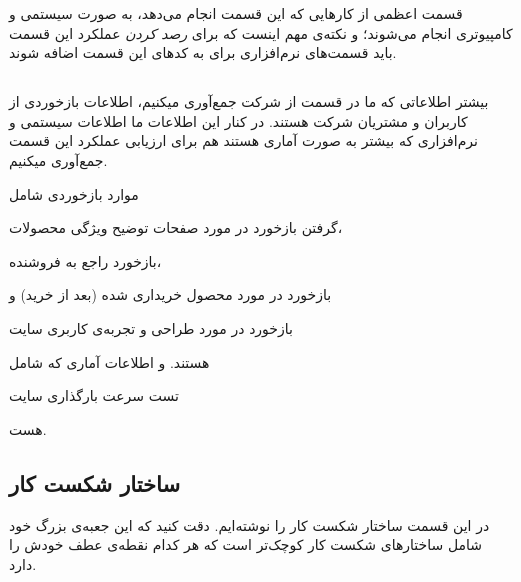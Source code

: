 قسمت اعظمی از کار‌هایی که این قسمت انجام می‌دهد، به صورت سیستمی و کامپیوتری انجام می‌شوند؛ و نکته‌ی مهم اینست که برای \textit{رصد کردن} عملکرد این قسمت باید قسمت‌های نرم‌افزاری برای  به کد‌های این قسمت اضافه شوند. 

\subsection{}\label{ssec:site}
بیشتر اطلاعاتی که ما در قسمت 
از شرکت جمع‌آوری میکنیم، اطلاعات بازخوردی از کاربران و مشتریان شرکت هستند. در کنار این اطلاعات ما اطلاعات سیستمی و نرم‌افزاری که بیشتر به صورت آماری هستند هم برای ارزیابی عملکرد این قسمت جمع‌آوری میکنیم.

موارد بازخوردی شامل
\begin{enumerate*}
\item گرفتن بازخورد در مورد صفحات توضیح ویژگی محصولات،
\item بازخورد راجع به فروشنده،
\item بازخورد در مورد محصول خریداری شده (بعد از خرید) و
\item بازخورد در مورد طراحی و تجربه‌ی کاربری سایت
\end{enumerate*} 
هستند. و اطلاعات آماری که شامل
\begin{enumerate*}
\item تست سرعت بارگذاری سایت
\end{enumerate*}
هست.

\subsection{}

\subsection{ساختار شکست کار}
در این قسمت ساختار شکست کار‌ را نوشته‌ایم. دقت کنید که این جعبه‌ی بزرگ خود شامل ساختارهای شکست کار کوچک‌تر است که هر کدام نقطه‌ی عطف خودش را دارد.

